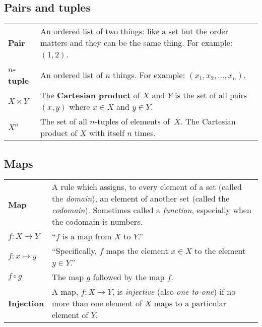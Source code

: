 \documentclass[10pt, a4paper, landscape]{article}
\newcommand{\defn}[1]{\textbf{#1}}
\begin{document}
\begin{multicols*}{3}
\subsection*{Pairs and tuples}
\begin{tabularx}{\columnwidth}{@{}l>{\raggedright\arraybackslash}X@{}}
  \toprule
  \defn{Pair} & An ordered list of two things: like a set but the order matters and they can be the same thing. For example: $(1, 2)$. \\
  
  \defn{$n$-tuple} & An ordered list of $n$ things. For example: $(x_1, x_2,\dotsc, x_n)$. \\

  $X\times Y$      & The \defn{Cartesian product} of $X$ and $Y$ is the set
  of all pairs $(x,y)$ where $x \in X$ and $y \in Y$. \\

  $X^n$ & The set of all $n$-tuples of elements of~$X$. The Cartesian product of $X$ with itself $n$ times. \\

\end{tabularx}


\subsection*{Maps}
\begin{tabularx}{\columnwidth}{@{}l>{\raggedright\arraybackslash}X@{}}
  \toprule
  \defn{Map} & A rule which assigns, to every element of a set (called the \emph{domain}), an element of another set (called the \emph{codomain}). Sometimes called a \emph{function}, especially when the codomain is numbers. \\

  $f\colon X\to Y$   & ``$f$ is a map from $X$ to $Y$.'' \\

  $f\colon x \mapsto y$  & ``Specifically, $f$ maps the element $x \in X$ to the
  element $y \in Y$.'' \\
  $f \circ g$    & The map $g$ followed by the map $f$. \\

  \defn{Injection} & A map, $f\colon X \to Y$, is \emph{injective} (also
  \emph{one-to-one}) if no more than one element of $X$ maps to a
  particular element of $Y$. \\


\end{tabularx}
\end{multicols*}
\end{document}

